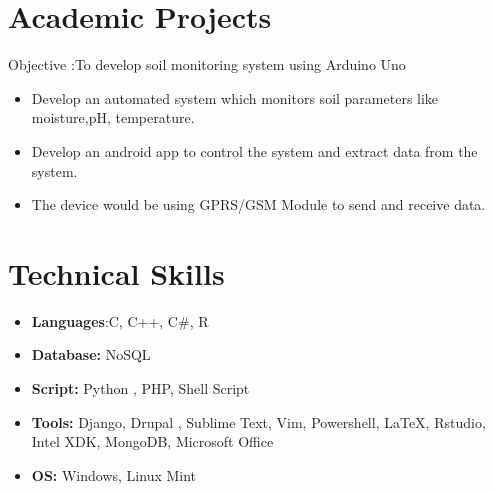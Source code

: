 \documentclass[11pt,a4paper,sans]{moderncv}        %
\begin{document}
\section{Academic Projects}
\newline{}%
Objective :To develop soil monitoring system using Arduino Uno%
\begin{itemize}%
\item Develop an automated system which monitors soil parameters like moisture,pH, temperature.
\item  Develop an android app to control the system and extract data from the system.
\item The device would be using GPRS/GSM Module to send and receive data.
\end{itemize}

\section{Technical Skills}
\begin{itemize}
\item  \textbf{Languages}:C, C++, C\#, R
\end{itemize}
\begin{itemize}
\item  \textbf{Database:} NoSQL
\end{itemize}
\begin{itemize}
\item  \textbf{Script:} Python , PHP, Shell Script
\end{itemize}
\begin{itemize}
\item  \textbf{Tools:} Django, Drupal ,  Sublime Text, Vim, Powershell, \LaTeX, Rstudio, Intel XDK, MongoDB, Microsoft Office
\end{itemize}
\begin{itemize}
\item  \textbf{OS:} Windows, Linux Mint
 
\end{itemize}
\end{document}
